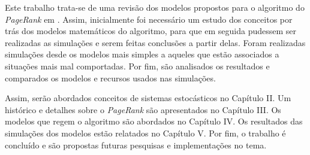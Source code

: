 Este trabalho trata-se de uma revisão dos modelos propostos para o algoritmo do \textit{PageRank} em \cite{ishii2014pagerank}. Assim, inicialmente foi necessário um estudo dos conceitos por trás dos modelos matemáticos do algoritmo, para que em seguida pudessem ser realizadas as simulações e serem feitas conclusões a partir delas. Foram realizadas simulações desde os modelos mais simples a aqueles que estão associados a situações mais mal comportadas. Por fim, são analisados os resultados e comparados os modelos e recursos usados nas simulações.

Assim, serão abordados conceitos de sistemas estocásticos no Capítulo II. Um histórico e detalhes sobre o \textit{PageRank} são apresentados no Capítulo III. Os modelos que regem o algoritmo são abordados no Capítulo IV. Os resultados das simulações dos modelos estão relatados no Capítulo V. Por fim, o trabalho é concluído e são propostas futuras pesquisas e implementações no tema.